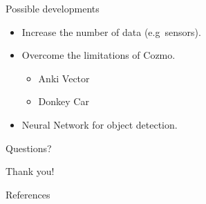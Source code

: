 \documentclass[aspectratio=169,handout]{beamer}
\begin{document}
\begin{frame}{Possible developments}
	\begin{itemize}
		\item Increase the number of data (e.g\ sensors).
		\item Overcome the limitations of Cozmo.
		\begin{itemize}
			\item Anki Vector
			\item Donkey Car
		\end{itemize}
		\item Neural Network for object detection.
	\end{itemize}
\end{frame}

{
	\begin{frame}[standout]
		Questions?
	\end{frame}
}
\begin{frame}[standout]
	Thank you!
\end{frame}
\begin{frame}[allowframebreaks]{References}

	\printbibliography

\end{frame}
\end{document}
